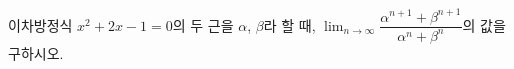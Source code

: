 이차방정식 $x^2+2x-1=0$의 두 근을 $\alpha$, $\beta$라 할 때, $\displaystyle\lim_{n\to\infty}\dfrac{\alpha^{n+1}+\beta^{n+1}}{\alpha^n+\beta^n}$의 값을 구하시오.
